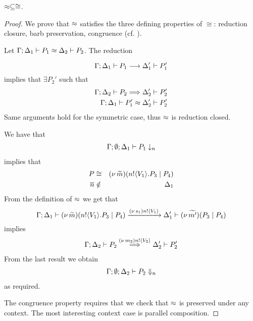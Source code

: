 
\begin{lemma}
	\label{app:lem:wbc_is_cong}
	$\approx \subseteq \cong$.
\end{lemma}


\begin{proof}
	\noi We prove that $\approx$ satisfies the three defining properties of $\cong$:
	reduction closure, barb preservation, congruence (cf. ).
%

	Let
		$\Gamma; \Delta_1 \vdash P_1 \approx \Delta_2 \vdash P_2$. The reduction

	\[
		\Gamma; \Delta_1 \vdash P_1 \longrightarrow \Delta_1' \vdash P_1'
	\]
%
	\noi implies that 
	$\exists P_2'$ such that 
%
	\begin{eqnarray*}
		\Gamma; \Delta_2 \vdash P_2 \stackrel{}{\Longrightarrow} \Delta_2' \vdash P_2'\\
		\Gamma; \Delta_1 \vdash P_1' \approx \Delta_2' \vdash P_2'
	\end{eqnarray*}
%
	\noi Same arguments hold for the symmetric case, thus $\approx$ is reduction closed.

	 We have that
%
	\begin{eqnarray*}
		\Gamma; \emptyset; \Delta_1 \vdash P_1 \downarrow_{n}
	\end{eqnarray*}
%
	implies that
	\begin{eqnarray*}
		P &\cong& (\nu\, \widetilde{m})(n ! \langle V_1 \rangle . P_3 \;|\; P_4)\\
		\overline{n} &\notin& \Delta_1
	\end{eqnarray*}
%
	\noi From the definition of $\approx$ we get that
%
\[
	\Gamma; \Delta_1 \vdash (\nu\, \widetilde{m})(n ! \langle V_1 \rangle . P_3 \;|\; P_4) \xrightarrow{(\nu\, s_1) n ! \langle V_1 \rangle} \Delta_1' \vdash (\nu\, \widetilde{m'})(P_3 \;|\; P_4)
\]
%
	\noi implies
%
	\begin{eqnarray*}
		\Gamma; \Delta_2 \vdash P_2 \stackrel{(\nu\, m_2) n ! \langle V_2 \rangle}{\Longrightarrow} \Delta_2' \vdash P_2'\\
	\end{eqnarray*}
%
	\noi From the last result we obtain
%
	\begin{eqnarray*}
		\Gamma; \emptyset; \Delta_2 \vdash P_2 \Downarrow_{n}
	\end{eqnarray*}
%
	\noi as required.


	\noi The congruence property requires that we check that $\approx$
	is preserved under any context.
	The most interesting context case is parallel composition.


\end{proof}
